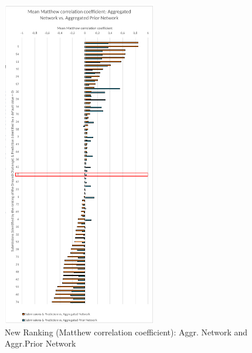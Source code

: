 \begin{figure}[H]
\centering
\includegraphics[width=0.6\textwidth]{./Bilder/Scoring/dreamchallenge/MeanMcc_vertical_comparison.pdf}
\caption[New Ranking: Matthew correlation coefficient]{New Ranking (Matthew correlation coefficient): Aggr. Network and Aggr.Prior Network}
\label{fig:}
\end{figure}




